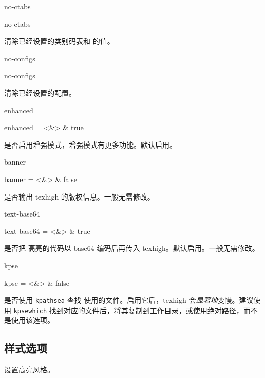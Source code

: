 \documentclass[class=article,openany]{cusdoc}
\begin{document}
\begin{keyval}[path=high]{no-ctabs}
  \begin{syntax}
    no-ctabs
  \end{syntax}
清除已经设置的类别码表和  的值。
\end{keyval}

\begin{keyval}[path=high]{no-configs}
  \begin{syntax}
    no-configs
  \end{syntax}
清除已经设置的配置。
\end{keyval}

\begin{keyval}[path=high]{enhanced}
  \begin{syntax}
    enhanced = <&\TTF> & true
  \end{syntax}
是否启用增强模式，增强模式有更多功能。默认启用。
\end{keyval}

\begin{keyval}[path=high]{banner}
  \begin{syntax}
    banner = <&\TTF> & false
  \end{syntax}
是否输出 texhigh 的版权信息。一般无需修改。
\end{keyval}

\begin{keyval}[path=high]{text-base64}
  \begin{syntax}
    text-base64 = <&\TTF> & true
  \end{syntax}
是否把  高亮的代码以 base64 编码后再传入 texhigh。默认启用。一般无需修改。
\end{keyval}

\begin{keyval}[path=high]{kpse}
  \begin{syntax}
    kpse = <&\TTF> & false
  \end{syntax}
是否使用 \texttt{kpathsea} 查找  使用的文件。启用它后，texhigh 会\emph{显著地}变慢。建议使用 \texttt{kpsewhich} 找到对应的文件后，将其复制到工作目录，或使用绝对路径，而不是使用该选项。
\end{keyval}

\subsection{样式选项}

\begin{function}{\THSaveStyle}
  \begin{syntax}
    \V\THSaveStyle {} 
  \end{syntax}
设置高亮风格。
\end{function}
\end{document}
